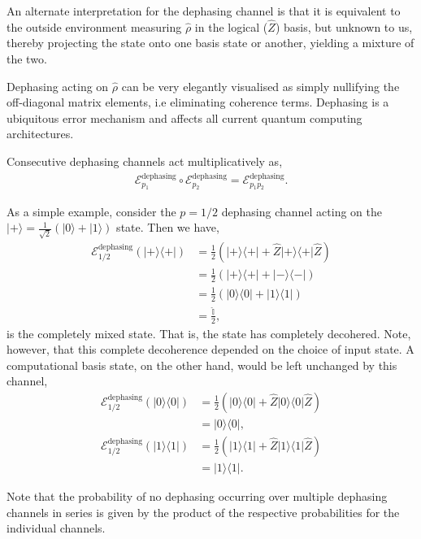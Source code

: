 \documentclass[aps, rmp, twocolumn, amsmath, amssymb, nofootinbib, superscriptaddress, longbibliography, floatfix, table-of-contents, eqsecnum]{revtex4-1}
\newcommand{\bra}[1]{\langle#1|}
\newcommand{\ket}[1]{|#1\rangle}
\begin{document}
An alternate interpretation for the dephasing channel is that it is equivalent to the outside environment measuring $\hat\rho$ in the logical ($\hat{Z}$) basis, but unknown to us, thereby projecting the state onto one basis state or another, yielding a mixture of the two.

Dephasing acting on $\hat\rho$ can be very elegantly visualised as simply nullifying the off-diagonal matrix elements, i.e eliminating coherence terms. Dephasing is a ubiquitous error mechanism and affects all current quantum computing architectures.

Consecutive dephasing channels act multiplicatively as,
\begin{align} \label{eq:multi_deph}
\mathcal{E}_{p_1}^\text{dephasing} \circ \mathcal{E}_{p_2}^\text{dephasing} = \mathcal{E}_{p_1 p_2}^\text{dephasing}.
\end{align}

As a simple example, consider the \mbox{$p=1/2$} dephasing channel acting on the \mbox{$\ket{+} = \frac{1}{\sqrt{2}}(\ket{0}+\ket{1})$} state. Then we have,
\begin{align}
\mathcal{E}^\text{dephasing}_{1/2}(\ket{+}\bra{+}) &= \frac{1}{2} (\ket{+}\bra{+} + \hat{Z}\ket{+}\bra{+}\hat{Z}) \nonumber \\
&= \frac{1}{2} (\ket{+}\bra{+} + \ket{-}\bra{-}) \nonumber \\
&= \frac{1}{2} (\ket{0}\bra{0} + \ket{1}\bra{1}) \nonumber \\
&= \frac{\mathbb{\hat{I}}}{2},
\end{align}
is the completely mixed state. That is, the state has completely decohered. Note, however, that this complete decoherence depended on the choice of input state. A computational basis state, on the other hand, would be left unchanged by this channel,
\begin{align}
\mathcal{E}^\text{dephasing}_{1/2}(\ket{0}\bra{0}) &= \frac{1}{2} (\ket{0}\bra{0} + \hat{Z}\ket{0}\bra{0}\hat{Z}) \nonumber \\
&= \ket{0}\bra{0}, \nonumber \\
\mathcal{E}^\text{dephasing}_{1/2}(\ket{1}\bra{1}) &= \frac{1}{2} (\ket{1}\bra{1} + \hat{Z}\ket{1}\bra{1}\hat{Z}) \nonumber \\
&= \ket{1}\bra{1}.
\end{align}

Note that the probability of no dephasing occurring over multiple dephasing channels in series is given by the product of the respective probabilities for the individual channels.
\end{document}
